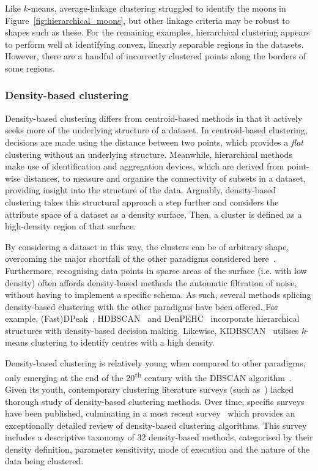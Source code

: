 Like \(k\)-means, average-linkage clustering struggled to identify the moons in
Figure~\ref{fig:hierarchical_moons}, but other linkage criteria may be robust to
shapes such as these. For the remaining examples, hierarchical clustering
appears to perform well at identifying convex, linearly separable regions in the
datasets. However, there are a handful of incorrectly clustered points along the
borders of some regions.

\subsubsection{Density-based clustering}

Density-based clustering differs from centroid-based methods in that
it actively seeks more of the underlying structure of a dataset. In
centroid-based clustering, decisions are made using the distance between two
points, which provides a \emph{flat} clustering without an underlying structure.
Meanwhile, hierarchical methods make use of identification and aggregation
devices, which are derived from point-wise distances, to measure and organise
the connectivity of subsets in a dataset, providing insight into the structure
of the data. Arguably, density-based clustering takes this structural approach a
step further and considers the attribute space of a dataset as a density
surface. Then, a cluster is defined as a high-density region of that surface.

By considering a dataset in this way, the clusters can be of arbitrary shape,
overcoming the major shortfall of the other paradigms considered
here~\cite{Raykov2016}. Furthermore, recognising data points in sparse areas of
the surface (i.e. with low density) often affords density-based methods the
automatic filtration of noise, without having to implement a specific schema. As
such, several methods splicing density-based clustering with the other paradigms
have been offered. For example, (Fast)DPeak~\cite{Chen2020},
HDBSCAN~\cite{Campello2013} and DenPEHC~\cite{Xu2016} incorporate hierarchical
structures with density-based decision making. Likewise,
KIDBSCAN~\cite{Tsai2006} utilises \(k\)-means clustering to identify centres
with a high density.

Density-based clustering is relatively young when compared to other paradigms,
only emerging at the end of the 20\textsuperscript{th} century with the DBSCAN
algorithm~\cite{Ester1996}. Given its youth, contemporary clustering literature
surveys (such as~\cite{Jain1999,Xu2005}) lacked thorough study of density-based
clustering methods. Over time, specific surveys have been published, culminating
in a most recent survey~\cite{Bhattacharjee2020} which provides an exceptionally
detailed review of density-based clustering algorithms. This survey includes a
descriptive taxonomy of 32 density-based methods, categorised by their density
definition, parameter sensitivity, mode of execution and the nature of the data
being clustered.

